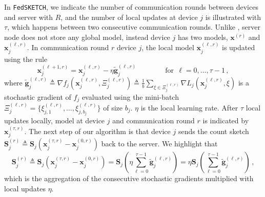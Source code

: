 \documentclass{article}
\begin{document}
In \texttt{FedSKETCH}, we indicate the number of communication rounds between devices and server with $R$, and the number of local updates at device $j$ is illustrated with $\tau$, which happens between two consecutive communication rounds. Unlike \cite{haddadpour2020federated}, server node does not store any global model, instead device $j$ has two models, $\boldsymbol{x}^{(r)}$ and $\boldsymbol{x}^{(\ell,r)}_j$. In communication round $r$ device $j$, the local model $\boldsymbol{x}^{(\ell,r)}_j$ is updated using the rule $$\boldsymbol{x}_j^{(\ell+1,r)}=\boldsymbol{x}_j^{(\ell,r)}-\eta \tilde{\mathbf{g}}_j^{(\ell,r)} \qquad\qquad \text{for}\:\:\ell=0,\ldots,\tau-1\, ,$$
where $\tilde{\mathbf{g}}_j^{(\ell,r)}\triangleq\nabla{f}_j(\boldsymbol{x}_j^{(\ell,r)},\Xi_j^{(\ell,r)})\triangleq\frac{1}{b}\sum_{\xi\in\Xi_j^{(\ell,r)}}\nabla{L}_j(\boldsymbol{x}_j^{(\ell,r)},\xi)$ is a stochastic gradient of $f_j$ evaluated using the mini-batch $\Xi_j^{(\ell,r)}=\{\xi^{(\ell,r)}_{j,1},\ldots,\xi^{(\ell,r)}_{j,b_j} \}$ of size $b_j$. $\eta$ is the local learning rate. After $\tau$ local updates locally, model at device $j$ and communication round $r$ is indicated by $\boldsymbol{x}_j^{(\tau,r)}$. The next step of our algorithm is that device $j$ sends the count sketch $\mathbf{S}_j^{(r)}\triangleq\mathbf{S}_j\left(\boldsymbol{x}_j^{(\tau,r)}-\boldsymbol{x}_j^{(0,r)}\right)$ back to the server. We highlight that $$\mathbf{S}_j^{(r)}\triangleq\mathbf{S}_j\left(\boldsymbol{x}_j^{(\tau,r)}-\boldsymbol{x}_j^{(0,r)}\right)=\mathbf{S}_j\left(\eta\sum_{\ell=0}^{\tau-1}\tilde{\mathbf{g}}_j^{(\ell,r)}\right)=\eta\mathbf{S}_j\left(\sum_{\ell=0}^{\tau-1}\tilde{\mathbf{g}}_j^{(\ell,r)}\right)\, ,$$ which is the aggregation of the consecutive stochastic gradients multiplied with local updates $\eta$.
\end{document}
